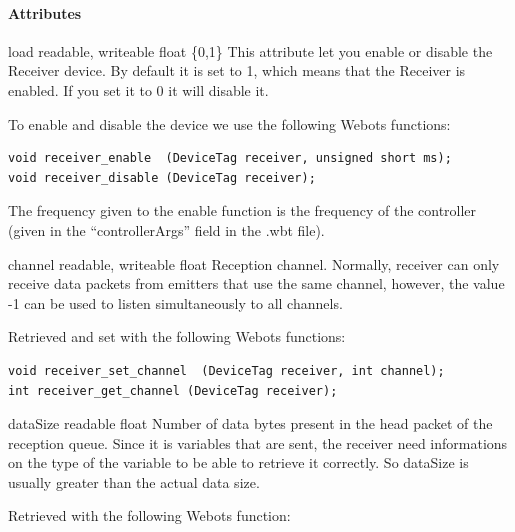 \paragraph{Attributes}
\label{webots.uobjects.robotdevices.receiver.attributes}%

\noindent
\begin{itemize}
\begin{attribute}{load}
  {readable, writeable}
  {float}
  {\{0,1\}}
  This attribute let you enable or disable the Receiver
  device.  By default it is set to 1, which means that the Receiver is
  enabled. If you set it to 0 it will disable it.


          To enable and disable the device we use the following Webots functions:


\begin{lstlisting}
void receiver_enable  (DeviceTag receiver, unsigned short ms);
void receiver_disable (DeviceTag receiver);
\end{lstlisting}

          The frequency given to the enable function is the frequency of the
          \urbi controller (given in the ``controllerArgs'' field in the .wbt file).
\end{attribute}

\begin{attribute}{channel}
  {readable, writeable}
  {float}
  {}
  Reception channel. Normally, receiver can only receive
 data packets from emitters that use the same channel, however, the
 value -{}1 can be used to listen simultaneously to all channels.


          Retrieved and set with the following Webots functions:


\begin{lstlisting}
void receiver_set_channel  (DeviceTag receiver, int channel);
int receiver_get_channel (DeviceTag receiver);
\end{lstlisting}
\end{attribute}

\begin{attribute}{dataSize}
  {readable}
  {float}
  {}
  Number of data bytes present in the head packet of the
 reception queue. Since it is \urbi variables that are sent, the
 receiver need informations on the type of the variable to be able to
 retrieve it correctly. So dataSize is usually greater than the actual
 data size.


          Retrieved with the following Webots function:



\end{attribute}
\end{itemize}
